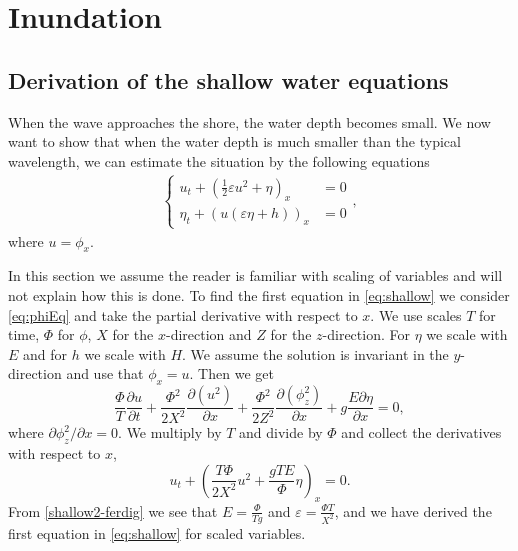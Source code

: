 \documentclass[11pt]{article}
\begin{document}
\section{Inundation}
%
%
\subsection{Derivation of the shallow water equations}
When the wave approaches the shore, the water depth becomes small. We now want to show that when the water depth is much smaller than the typical wavelength, we can estimate the situation by the following equations 
\begin{align}
    \label{eq:shallow}
    \begin{cases}
	    u_t + \left(\frac{1}{2}\varepsilon u^2 + \eta\right)_x & = 0 \\
	    \eta_t + (u(\varepsilon\eta + h))_x & = 0
	\end{cases},
\end{align}
where $u = \phi_x$. 

In this section we assume the reader is familiar with scaling of variables and will not explain how this is done. To find the first equation in \eqref{eq:shallow} we consider \eqref{eq:phiEq} and take the partial derivative
with respect to $x$. We use scales $T$ for time, $\Phi$ for $\phi$, $X$ for the $x$-direction and $Z$ for the $z$-direction. For $\eta$ we scale with $E$ and for $h$ we scale with $H$. We assume the solution is
invariant in the $y$-direction and use that $\phi_x=u$. Then we get 
\begin{equation*}
\frac{\Phi}{T}\frac{\partial u}{\partial t} + \frac{\Phi^2}{2X^2}\frac{\partial (u^2)}{\partial x}+ \frac{\Phi^2}{2Z^2}\frac{\partial(\phi_z^2)}{\partial x} + g\frac{E \partial \eta}{\partial x} = 0,
\end{equation*}
where $\partial\phi_z^2/\partial x=0$. We multiply by $T$ and divide by $\Phi$ and collect the derivatives with respect to $x$,
\begin{equation}
    \label{shallow2-ferdig}
    u_t + \left(\frac{T\Phi}{2X^2}u^2 + \frac{gTE}{\Phi}\eta\right)_x = 0.
\end{equation}
From \eqref{shallow2-ferdig} we see that $E = \frac{\Phi}{T g}$ and $\varepsilon =\frac{\Phi T}{X^2}$, and we have derived the first equation in \eqref{eq:shallow} for scaled variables.
\end{document}
